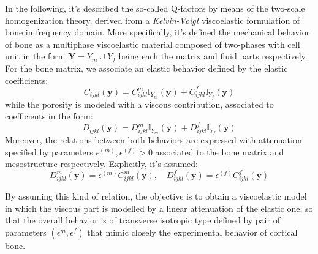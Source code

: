 In the following, it's described the so-called Q-factors by means of the two-scale homogenization theory, derived from a \textit{Kelvin-Voigt} viscoelastic formulation of bone in frequency domain. More specifically, it's defined the mechanical behavior of bone as a multiphase viscoelastic material composed of two-phases with cell unit in the form $\mathbf{Y} = Y_{m} \cup Y_{f}$ being each the matrix and fluid parts respectively.
For the bone matrix, we associate an elastic behavior defined by the elastic coefficients:
\begin{equation*}
    C_{ijkl}(\mathbf{y}) = C_{ijkl}^m \mathbb{I}_{Y_m}(\mathbf{y}) + C_{ijkl}^f \mathbb{I}_{Y_f}(\mathbf{y})
\end{equation*}
while the porosity is modeled with a viscous contribution, associated to coefficients in the form:
\begin{equation*}
    D_{ijkl}(\mathbf{y}) =  D_{ijkl}^m \mathbb{I}_{Y_m}(\mathbf{y}) + D_{ijkl}^f \mathbb{I}_{Y_f}(\mathbf{y})
\end{equation*}
Moreover, the relations between both behaviors are expressed with attenuation specified by parameters $\epsilon^{(m)}, \epsilon^{(f)} >0$ associated to the bone matrix and mesostructure respectively. Explicitly, it's assumed:
\begin{equation*}
    D_{ijkl}^m(\mathbf{y}) = \epsilon^{(m)} C_{ijkl}^m(\mathbf{y}) , \quad D_{ijkl}^f (\mathbf{y}) = \epsilon^{(f)} C_{ijkl}^f(\mathbf{y})
\end{equation*}


\begin{rem}
By assuming this kind of relation, the objective is to obtain a viscoelastic model in which the viscous part is modelled by a linear attenuation of the elastic one, so that the overall behavior is of transverse isotropic type defined by pair of parameters $(\epsilon^m, \epsilon^f)$ that mimic closely the experimental behavior of cortical bone.
\end{rem}


